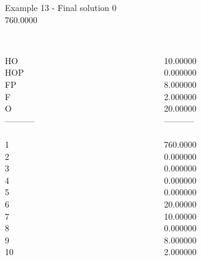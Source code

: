 \begin{frame}{Example 13 - Final solution}
\footnotesize
{}  0\\
  760.0000\\

\begin{columns}[t]
\begin{column}{0.3\textwidth}
\\
HO\\
HOP\\
FP\\
F\\
O\\
-----------\\
\\
1\\
2\\
3\\
4\\
5\\
6\\
7\\
8\\
9\\
10\\

\end{column}
\begin{column}{0.3\textwidth}
\\
10.00000\\
0.000000\\
8.000000\\
2.000000\\
20.00000\\
-----------\\
\\
760.0000\\
0.000000\\
0.000000\\
0.000000\\
0.000000\\
20.00000\\
10.00000\\
0.000000\\
8.000000\\
2.000000\\
\end{column}


\end{columns}
\end{frame}
